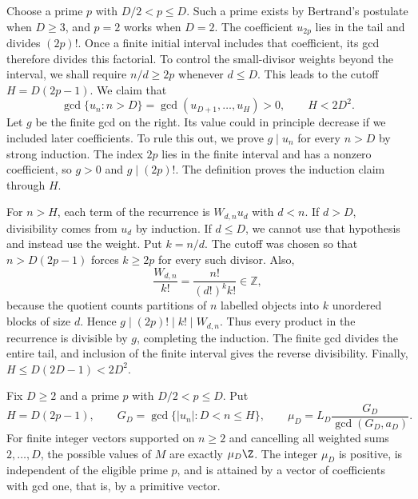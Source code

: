 Choose a prime $p$ with $D/2<p\le D$. Such a prime exists by Bertrand's
postulate when $D\ge3$, and $p=2$ works when $D=2$. The coefficient
$u_{2p}$ lies in the tail and divides $(2p)!$. Once a finite initial
interval includes that coefficient, its gcd therefore divides this
factorial. To control the small-divisor weights beyond the interval,
we shall require $n/d\ge2p$ whenever $d\le D$. This leads to the
cutoff $H=D(2p-1)$. We claim that
\begin{equation}\label{long68:eq:finite-horizon}
 \gcd\{u_n:n>D\}=\gcd(u_{D+1},\ldots,u_H)>0,\qquad H<2D^2.
\end{equation}
Let $g$ be the finite gcd on the right. Its value could in principle
decrease if we included later coefficients. To rule this out, we prove
$g\mid u_n$ for every $n>D$ by strong induction.
The index $2p$ lies in the finite interval and has a nonzero coefficient,
so $g>0$ and $g\mid(2p)!$. The definition proves the induction claim
through $H$.

For $n>H$, each term of the recurrence is $W_{d,n}u_d$ with $d<n$.
If $d>D$, divisibility comes from $u_d$ by induction. If $d\le D$,
we cannot use that hypothesis and instead use the weight. Put $k=n/d$.
The cutoff was chosen so that $n>D(2p-1)$ forces $k\ge2p$ for
every such divisor. Also,
\[
 \frac{W_{d,n}}{k!}=\frac{n!}{(d!)^k k!}\in\mathbb Z,
\]
because the quotient counts partitions of $n$ labelled objects into
$k$ unordered blocks of size $d$. Hence
$g\mid(2p)!\mid k!\mid W_{d,n}$. Thus every product in the recurrence
is divisible by $g$, completing the induction.
The finite gcd divides the entire tail, and inclusion of the finite
interval gives the reverse divisibility. Finally,
$H\le D(2D-1)<2D^2$.

\begin{theorem}\label{long68:res:moment-ideal}
Fix $D\ge2$ and a prime $p$ with $D/2<p\le D$.  Put
\[
 H=D(2p-1),\qquad
 G_D=\gcd\{|u_n|:D<n\le H\},\qquad
 \mu_D=L_D\frac{G_D}{\gcd(G_D,a_D)}.
\]
For finite integer vectors supported on $n\ge2$ and cancelling all
weighted sums $2,\ldots,D$, the possible values of $M$ are exactly $\mu_D\Z$.  The integer $\mu_D$ is positive,
is independent of the eligible prime $p$, and is attained by a vector of
coefficients with gcd one, that is, by a primitive vector.
\end{theorem}

